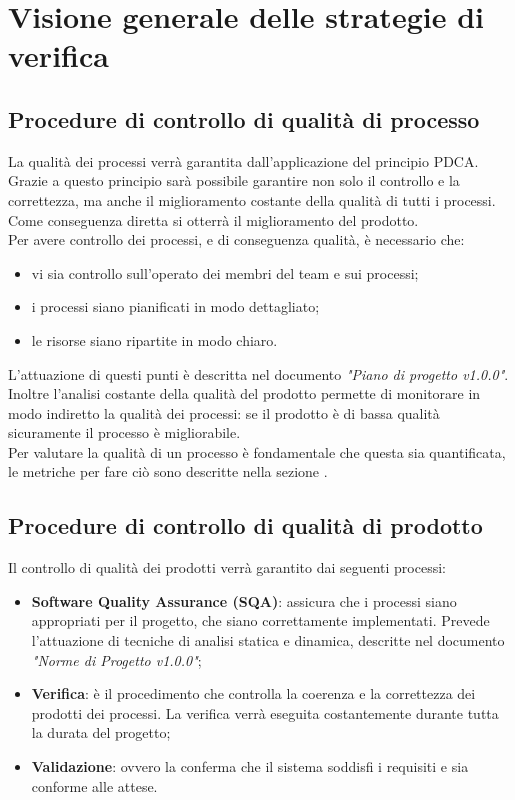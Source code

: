 \documentclass[12pt,a4paper,titlepage]{article}
\begin{document}
	\newpage
	\section{Visione generale delle strategie di verifica}
	\subsection{Procedure di controllo di qualità di processo}
	La qualità dei processi verrà garantita dall'applicazione del principio PDCA. Grazie a questo principio sarà possibile garantire non solo il controllo e la correttezza, ma anche il miglioramento costante della qualità di tutti i processi. Come conseguenza diretta si otterrà il miglioramento del prodotto.\\
	Per avere controllo dei processi, e di conseguenza qualità, è necessario che:
	\begin{itemize}
		\item vi sia controllo sull'operato dei membri del team e sui processi;
		\item i processi siano pianificati in modo dettagliato;
		\item le risorse siano ripartite in modo chiaro.
	\end{itemize}
	L'attuazione di questi punti è descritta nel documento \textit{"Piano di progetto v1.0.0"}. Inoltre l'analisi costante della qualità del prodotto permette di monitorare in modo indiretto la qualità dei processi: se il prodotto è di bassa qualità sicuramente il processo è migliorabile.\\
	Per valutare la qualità di un processo è fondamentale che questa sia quantificata, le metriche per fare ciò sono descritte nella sezione .
	
	\subsection{Procedure di controllo di qualità di prodotto}
	Il controllo di qualità dei prodotti verrà garantito dai seguenti processi:
	\begin{itemize}
		\item \textbf{Software Quality Assurance (SQA)}: assicura che i processi siano appropriati per il progetto, che siano correttamente implementati. Prevede l'attuazione di tecniche di analisi statica e dinamica, descritte nel documento \textit{"Norme di Progetto v1.0.0"};
		\item \textbf{Verifica}: è il procedimento che controlla la coerenza e la correttezza dei prodotti dei processi. La verifica verrà eseguita costantemente durante tutta la durata del progetto;
		\item \textbf{Validazione}: ovvero la conferma che il sistema soddisfi i requisiti e sia conforme alle attese.
	\end{itemize}
\end{document}
